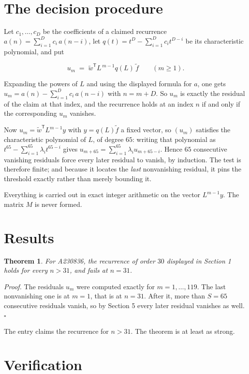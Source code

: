 \documentclass[11pt]{article}
\newtheorem{theorem}{Theorem}
\theoremstyle{definition}
\begin{document}
\section{The decision procedure}

Let $c_1,\dots,c_D$ be the coefficients of a claimed recurrence $a(n) = \sum_{i=1}^{D} c_i\,a(n-i)$, let $q(t) = t^{D} - \sum_{i=1}^{D} c_i t^{D-i}$ be its characteristic polynomial, and put

\[u_m \;=\; \tilde w^{\mathsf T} L^{\,m-1} q(L)\,\tilde f \qquad (m \ge 1).\]

Expanding the powers of $L$ and using the displayed formula for $a$, one gets $u_m = a(n) - \sum_{i=1}^{D} c_i\,a(n-i)$ with $n = m + D$. So $u_m$ is exactly the residual of the claim at that index, and the recurrence holds at an index $n$ if and only if the corresponding $u_m$ vanishes.

Now $u_m = \tilde w^{\mathsf T} L^{m-1} y$ with $y = q(L)\tilde f$ a fixed vector, so $(u_m)$ satisfies the characteristic polynomial of $L$, of degree $65$: writing that polynomial as $t^{65} - \sum_{i=1}^{65} \lambda_i t^{65-i}$ gives $u_{m+65} = \sum_{i=1}^{65} \lambda_i u_{m+65-i}$. Hence $65$ consecutive vanishing residuals force every later residual to vanish, by induction. The test is therefore finite; and because it locates the {\itshape last} nonvanishing residual, it pins the threshold exactly rather than merely bounding it.

Everything is carried out in exact integer arithmetic on the vector $L^{m-1}y$. The matrix $M$ is never formed.

\section{Results}

\begin{theorem} For A230836, the recurrence of order $30$ displayed in Section 1 holds for every $n > 31$, and fails at $n = 31$.\end{theorem}

{\itshape Proof.} The residuals $u_m$ were computed exactly for $m = 1,\dots,119$. The last nonvanishing one is at $m = 1$, that is at $n = 31$. After it, more than $S = 65$ consecutive residuals vanish, so by Section 5 every later residual vanishes as well. $\square$

The entry claims the recurrence for $n > 31$. The theorem is at least as strong.

\section{Verification}
\end{document}
